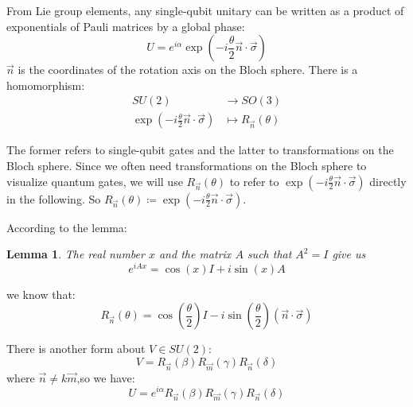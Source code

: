 \documentclass[a4paper,10pt]{article}
\newtheorem{lemma}{Lemma}[subsection]
\numberwithin{equation}{subsection}
\begin{document}
From Lie group elements, any single-qubit unitary can be written as a product of exponentials of Pauli matrices by a global phase:
\begin{equation}
    U = e^{i\alpha}\exp\left(-i\frac{\theta}{2}\vec{n}\cdot\vec{\sigma}\right)
\end{equation}
$\vec{n}$ is the coordinates of the rotation axis on the Bloch sphere.
There is a homomorphism:
\begin{equation}
    \begin{split}
        SU(2)                                                       & \to SO(3)
        \\
        \exp\left(-i\frac{\theta}{2}\vec{n}\cdot\vec{\sigma}\right) & \mapsto R_{\vec{n}}(\theta)
    \end{split}
\end{equation}

The former refers to single-qubit gates and the latter to transformations on the Bloch sphere. Since we often need transformations on the Bloch sphere to visualize quantum gates, we will use $R_{\vec{n}}(\theta)$ to refer to $\exp\left(-i\frac{\theta}{2}\vec{n}\cdot\vec{\sigma}\right)$ directly in the following. So $R_{\vec{n}}(\theta) \coloneqq \exp\left(-i\frac{\theta}{2}\vec{n}\cdot\vec{\sigma}\right)$.

According to the lemma:
\begin{lemma}
    The real number $x$ and the matrix $A$ such that $A^2=I$ give us
    \begin{equation}
        e^{iAx}=\cos (x)I+i\sin (x)A
    \end{equation}
\end{lemma}

we know that:
\begin{equation}
    R_{\vec{n}}(\theta)=\cos \left(\frac{\theta}{2}\right)I-i\sin \left(\frac{\theta}{2}\right)(\vec{n}\cdot\vec{\sigma})
\end{equation}


There is another form about $V\in SU(2)$:
\begin{equation}
    V=R_{\vec{n}}(\beta)R_{\vec{m}}(\gamma)R_{\vec{n}}(\delta)
\end{equation}
where $\vec{n}\neq k\vec{m}$,so we have:
\begin{equation}\label{EulerAngle}
    U=e^{i\alpha}R_{\vec{n}}(\beta)R_{\vec{m}}(\gamma)R_{\vec{n}}(\delta)
\end{equation}
\end{document}
